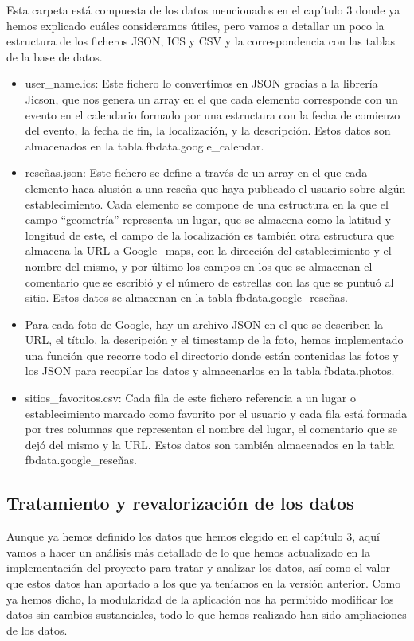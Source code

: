 Esta carpeta está compuesta de los datos mencionados en el capítulo 3 donde ya hemos explicado cuáles consideramos útiles, pero vamos a detallar un poco la estructura de los ficheros JSON, ICS y CSV y la correspondencia con las tablas de la base de datos.
\begin{itemize}
	\item user\_name.ics: Este fichero lo convertimos en JSON gracias a la librería Jicson, que nos genera un array en el que cada elemento corresponde con un evento en el calendario formado por una estructura con la fecha de comienzo del evento, la fecha de fin, la localización, y la descripción. Estos datos son almacenados en la tabla fbdata.google\_calendar.
	
	\item reseñas.json: Este fichero se define a través de un array en el que cada elemento haca alusión a una reseña que haya publicado el usuario sobre algún establecimiento. Cada elemento se compone de una estructura en la que el campo ``geometría'' representa un lugar, que se almacena como la latitud y longitud de este, el campo de la localización es también otra estructura que almacena la URL a Google\_maps, con la dirección del establecimiento y el nombre del mismo, y por último los campos en los que se almacenan el comentario que se escribió y el número de estrellas con las que se puntuó al sitio. Estos datos se almacenan en la tabla fbdata.google\_reseñas.
	
	\item Para cada foto de Google, hay un archivo JSON en el que se describen la URL, el título, la descripción y el timestamp de la foto, hemos implementado una función que recorre todo el directorio donde están contenidas las fotos y los JSON para recopilar los datos y almacenarlos en la tabla fbdata.photos.
	
	\item sitios\_favoritos.csv: Cada fila de este fichero referencia a un lugar o establecimiento marcado como favorito por el usuario y cada fila está formada por tres columnas que representan el nombre del lugar, el comentario que se dejó del mismo y la URL. Estos datos son también almacenados en la tabla fbdata.google\_reseñas.
	
\end{itemize}


\subsection{Tratamiento y revalorización de los datos}
Aunque ya hemos definido los datos que hemos elegido en el capítulo 3, aquí vamos a hacer un análisis más detallado de lo que hemos actualizado en la implementación del proyecto para tratar y analizar los datos, así como el valor que estos datos han aportado a los que ya teníamos en la versión anterior. Como ya hemos dicho, la modularidad de la aplicación nos ha permitido modificar los datos sin cambios sustanciales, todo lo que hemos realizado han sido ampliaciones de los datos.

